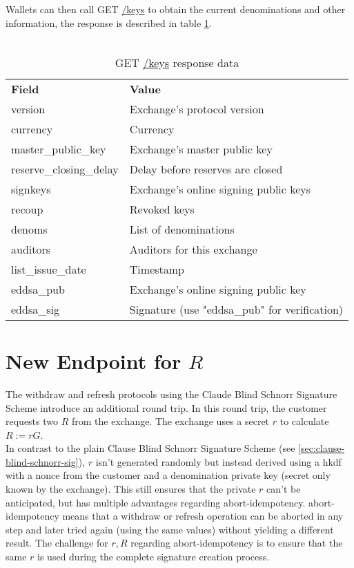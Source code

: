 Wallets can then call GET \url{/keys} to obtain the current denominations and other information, the response is described in table \ref{tab:keys-get}. \\\\
\begin{table}[ht]
  \centering
  \setupBfhTabular
  \begin{tabular}{ll}
      \rowcolor{BFH-tablehead}
      \textbf{Field} & \textbf{Value} \\
      version & Exchange's protocol version \\
      currency & Currency \\
      master\_public\_key & Exchange's master public key \\
      reserve\_closing\_delay & Delay before reserves are closed \\
      signkeys & Exchange's online signing public keys \\
      recoup & Revoked keys \\
      denoms & List of denominations \\
      auditors & Auditors for this exchange \\
      list\_issue\_date & Timestamp \\
      eddsa\_pub & Exchange's online signing public key \\
      eddsa\_sig & Signature (use "eddsa\_pub" for verification) \\
  \end{tabular}
  \caption{GET \url{/keys} response data}
  \label{tab:keys-get}
\end{table}


\section{New Endpoint for $R$}
The withdraw and refresh protocols using the  Claude Blind Schnorr Signature Scheme introduce an additional round trip.
In this round trip, the customer requests two $ R $ from the exchange.
The exchange uses a secret $ r $ to calculate $ R := rG $.
\\
In contrast to the plain Clause Blind Schnorr Signature Scheme (see \ref{sec:clause-blind-schnorr-sig}), $ r $ isn't generated randomly but instead derived using a \gls{hkdf} with a nonce from the customer and a denomination private key (secret only known by the exchange).
This still ensures that the private $ r $ can't be anticipated, but has multiple advantages regarding \gls{abort-idempotency}.
\Gls{abort-idempotency} means that a withdraw or refresh operation can be aborted in any step and later tried again (using the same values) without yielding a different result.
The challenge for $ r, R $ regarding \gls{abort-idempotency} is to ensure that the same $ r $ is used during the complete signature creation process.

